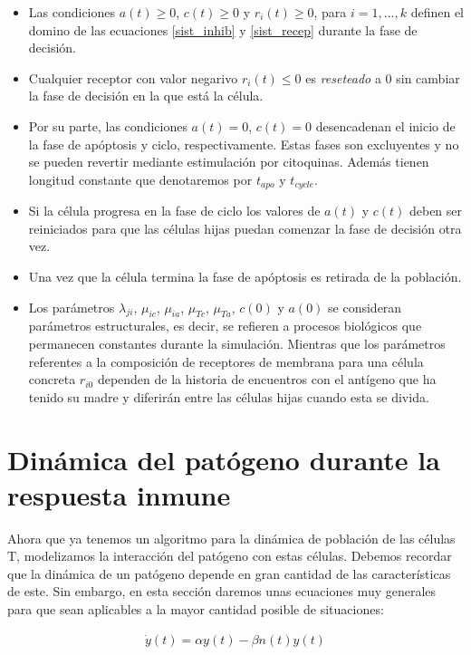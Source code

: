 \begin{itemize}
	\item Las condiciones $a(t)\geq0$, $c(t)\geq0$ y $r_i(t)\geq0$, para $i=1,...,k$ definen el domino de las ecuaciones \ref{sist_inhib} y \ref{sist_recep} durante la fase de decisión. 
	\item Cualquier receptor con valor negarivo $r_i(t)\leq0$ es \textit{reseteado} a 0 sin cambiar la fase de decisión en la que está la célula.
	\item Por su parte, las condiciones $a(t)=0$, $c(t)=0$ desencadenan el inicio de la fase de apóptosis y ciclo, respectivamente. Estas fases son excluyentes y no se pueden revertir mediante estimulación por citoquinas. Además tienen longitud constante que denotaremos por $t_{apo}$ y $t_{cycle}$.
	\item Si la célula progresa en la fase de ciclo los valores de $a(t)$ y $c(t)$ deben ser reiniciados para que las células hijas puedan comenzar la fase de decisión otra vez. 
	\item Una vez que la célula termina la fase de apóptosis es retirada de la población.
	\item Los parámetros $\lambda_{ji}$, $\mu_{ic}$, $\mu_{ia}$, $\mu_{Tc}$, $\mu_{Ta}$, $c(0)$ y $a(0)$ se consideran parámetros estructurales, es decir, se refieren a procesos biológicos que permanecen constantes durante la simulación. Mientras que los parámetros referentes a la composición de receptores de membrana para una célula concreta $r_{i0}$ dependen de la historia de encuentros con el antígeno que ha tenido su madre y diferirán entre las células hijas cuando esta se divida.
\end{itemize}


\section{Dinámica del patógeno durante la respuesta inmune}

Ahora que ya tenemos un algoritmo para la dinámica de población de las células T, modelizamos la interacción del patógeno con estas células. Debemos recordar que la dinámica de un patógeno depende en gran cantidad de las características de este. Sin embargo, en esta sección daremos unas ecuaciones muy generales para que sean aplicables a la mayor cantidad posible de situaciones:

\begin{equation}
	\label{sist_pat_T}
	\begin{array}{ll}
	\dot{y}(t) = \alpha y(t) - \beta n(t)y(t)
	\end{array}
\end{equation} 

